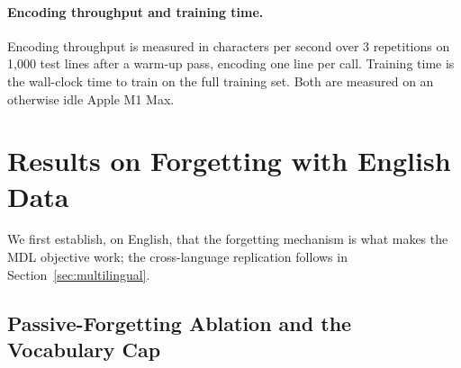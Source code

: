 \documentclass[pdflatex,sn-apa]{sn-jnl}
\begin{document}
\paragraph{Encoding throughput and training time.}
Encoding throughput is measured in characters per second over 3
repetitions on 1,000 test lines after a warm-up pass, encoding one line
per call. Training time is the wall-clock time to train on the full
training set. Both are measured on an otherwise idle Apple M1 Max.


\section{Results on Forgetting with English Data}
\label{sec:english}

We first establish, on English, that the forgetting mechanism is what makes
the MDL objective work; the
cross-language replication follows in Section~\ref{sec:multilingual}.

\subsection{Passive-Forgetting Ablation and the Vocabulary Cap}
\end{document}
